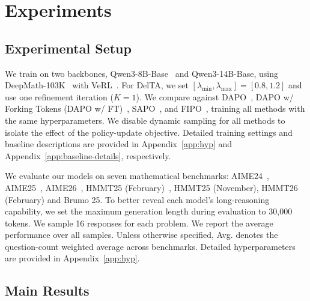 \documentclass{llmxive}
\providecommand{\bodystrut}{\rule[-0.25ex]{0pt}{2.45ex}}
\begin{document}
\section{Experiments}
\subsection{Experimental Setup}
\label{sec:exp_s}
We train on two backbones, Qwen3-8B-Base~\citep{yang2025qwen3} and Qwen3-14B-Base, using DeepMath-103K~\citep{he2025deepmath} with VeRL~\citep{sheng2024hybridflow}. For DelTA, we set \([\lambda_{\min},\lambda_{\max}]=[0.8,1.2]\) and use one refinement iteration (\(K=1\)). We compare against DAPO~\citep{yu2025dapo}, DAPO w/ Forking Tokens (DAPO w/ FT)~\citep{wang2025beyond}, SAPO~\citep{gao2025soft}, and FIPO~\citep{ma2026fipo}, training all methods with the same hyperparameters. We disable dynamic sampling for all methods to isolate the effect of the policy-update objective. Detailed training settings and baseline descriptions are provided in Appendix~\ref{app:hyp} and Appendix~\ref{app:baseline-details}, respectively.

We evaluate our models on seven mathematical benchmarks: AIME24~\citep{aime24}, AIME25~\citep{aime25}, AIME26~\citep{aime26}, HMMT25 (February)~\citep{balunovic_srimatharena_2025}, HMMT25 (November), HMMT26 (February) and Brumo 25.  To better reveal each model's long-reasoning capability, we set the maximum generation length during evaluation to 30{,}000 tokens. We sample 16 responses for each problem. We report the average performance over all samples. Unless otherwise specified, Avg. denotes the question-count weighted average across benchmarks. Detailed hyperparameters are provided in Appendix~\ref{app:hyp}.



\subsection{Main Results}
\label{sec:main-results}
\renewcommand{\bodystrut}{\rule[-0.25ex]{0pt}{2.45ex}}
\end{document}
